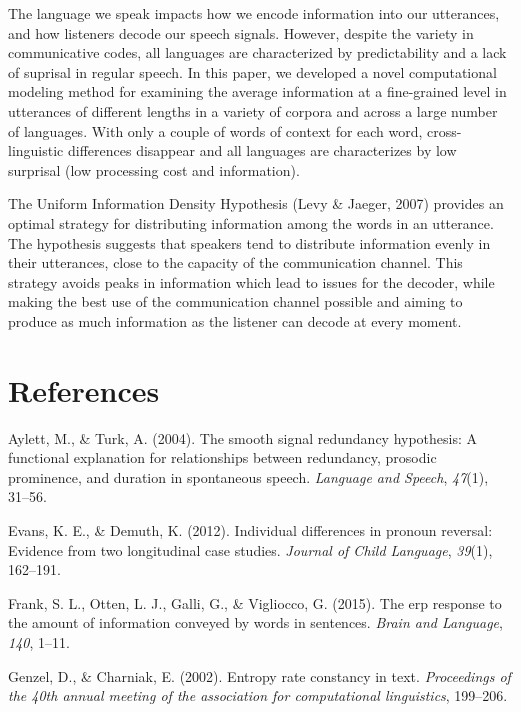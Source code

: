 \documentclass[11pt,]{article}
\begin{document}
The language we speak impacts how we encode information into our utterances, and how listeners decode our speech signals. However, despite the variety in communicative codes, all languages are characterized by predictability and a lack of suprisal in regular speech. In this paper, we developed a novel computational modeling method for examining the average information at a fine-grained level in utterances of different lengths in a variety of corpora and across a large number of languages. With only a couple of words of context for each word, cross-linguistic differences disappear and all languages are characterizes by low surprisal (low processing cost and information).

The Uniform Information Density Hypothesis (Levy \& Jaeger, 2007) provides an optimal strategy for distributing information among the words in an utterance. The hypothesis suggests that speakers tend to distribute information evenly in their utterances, close to the capacity of the communication channel. This strategy avoids peaks in information which lead to issues for the decoder, while making the best use of the communication channel possible and aiming to produce as much information as the listener can decode at every moment.

\hypertarget{references}{%
\section*{References}\label{references}}

\hypertarget{refs}{}
\leavevmode\hypertarget{ref-aylett2004smooth}{}%
Aylett, M., \& Turk, A. (2004). The smooth signal redundancy hypothesis: A functional explanation for relationships between redundancy, prosodic prominence, and duration in spontaneous speech. \emph{Language and Speech}, \emph{47}(1), 31--56.

\leavevmode\hypertarget{ref-evans2012individual}{}%
Evans, K. E., \& Demuth, K. (2012). Individual differences in pronoun reversal: Evidence from two longitudinal case studies. \emph{Journal of Child Language}, \emph{39}(1), 162--191.

\leavevmode\hypertarget{ref-frank2015erp}{}%
Frank, S. L., Otten, L. J., Galli, G., \& Vigliocco, G. (2015). The erp response to the amount of information conveyed by words in sentences. \emph{Brain and Language}, \emph{140}, 1--11.

\leavevmode\hypertarget{ref-genzel2002entropy}{}%
Genzel, D., \& Charniak, E. (2002). Entropy rate constancy in text. \emph{Proceedings of the 40th annual meeting of the association for computational linguistics}, 199--206.
\end{document}
